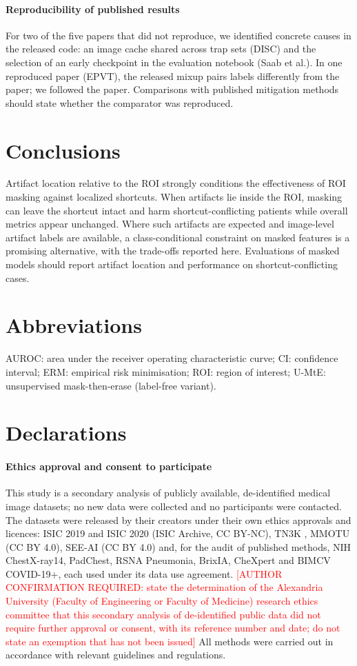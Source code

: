 \documentclass[12pt]{article}
\newcommand{\confirm}[1]{\textcolor{red}{[AUTHOR CONFIRMATION REQUIRED: #1]}}
\begin{document}
\paragraph{Reproducibility of published results} For two of the five papers that did not reproduce, we identified
concrete causes in the released code: an image cache shared across trap sets (DISC) and the selection of an early
checkpoint in the evaluation notebook (Saab et al.). In one reproduced paper (EPVT), the released mixup pairs labels
differently from the paper; we followed the paper. Comparisons with published mitigation methods should state whether the
comparator was reproduced.

\section*{Conclusions}
Artifact location relative to the ROI strongly conditions the effectiveness of ROI masking against localized shortcuts. When
artifacts lie inside the ROI, masking can leave the shortcut intact and harm shortcut-conflicting patients while overall
metrics appear unchanged. Where such artifacts are expected and image-level artifact labels are available, a
class-conditional constraint on masked features is a promising alternative, with the trade-offs reported here.
Evaluations of masked models should report artifact location and performance on shortcut-conflicting cases.

\section*{Abbreviations}
AUROC: area under the receiver operating characteristic curve; CI: confidence interval; ERM: empirical risk
minimisation; ROI: region of interest; U-MtE: unsupervised mask-then-erase (label-free variant).

\section*{Declarations}
\paragraph{Ethics approval and consent to participate} This study is a secondary analysis of publicly available,
de-identified medical image datasets; no new data were collected and no participants were contacted. The datasets were
released by their creators under their own ethics approvals and licences: ISIC 2019 and ISIC 2020 (ISIC Archive, CC
BY-NC), TN3K \cite{gong2021tn3k}, MMOTU \cite{zhao2022mmotu} (CC BY 4.0), SEE-AI \cite{seeai2023} (CC BY 4.0) and, for the
audit of published methods, NIH ChestX-ray14, PadChest, RSNA Pneumonia, BrixIA, CheXpert and BIMCV COVID-19+, each used
under its data use agreement. \confirm{state the determination of the Alexandria University (Faculty of Engineering or
Faculty of Medicine) research ethics committee that this secondary analysis of de-identified public data did not require
further approval or consent, with its reference number and date; do not state an exemption that has not been issued}
All methods were carried out in accordance with relevant guidelines and regulations.
\end{document}

